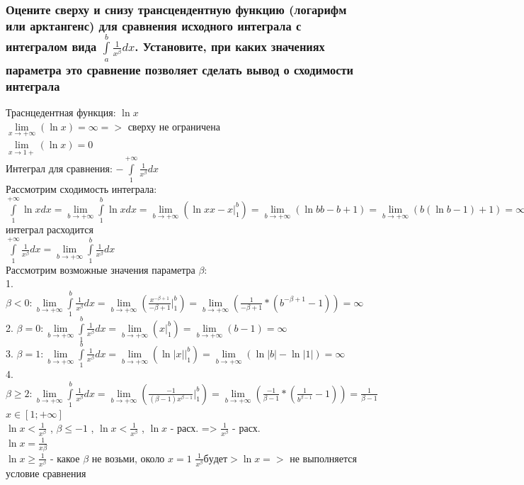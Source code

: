\documentclass{article}
\begin{document}
\subsubsection{Оцените сверху и снизу трансцендентную функцию (логарифм или арктангенс) для сравнения исходного интеграла с интегралом вида $ \int\limits^b_a \frac{1}{x^{\beta}}dx $. Установите, при каких значениях параметра это сравнение позволяет сделать вывод о сходимости интеграла}
Траснцедентная функция: $ \ln{x} $\\
$ \lim\limits_{x \to +\infty} (\ln{x}) = \infty => $ сверху не ограничена\\
$ \lim\limits_{x \to 1+} (\ln{x}) = 0 $\\
Интеграл для сравнения: $ -\int\limits^{+\infty}_{1} \frac{1}{x^{\beta}}dx $\\
Рассмотрим сходимость интеграла:\\
$ \int\limits^{+\infty}_{1} \ln{x}dx = \lim\limits_{b \to +\infty} \int\limits^{b}_{1} \ln{x}dx = \lim\limits_{b \to +\infty} (\ln{x}x - x |^b_1) = \lim\limits_{b \to +\infty} (\ln{b}b - b + 1) = \lim\limits_{b \to +\infty} (b(\ln{b} - 1) + 1) = \infty => $ интеграл расходится\\
$ \int\limits^{+\infty}_1 \frac{1}{x^{\beta}}dx = \lim\limits_{b \to +\infty} \int\limits^b_1 \frac{1}{x^{\beta}}dx $\\
Рассмотрим возможные значения параметра $\beta$:\\
1. $ \beta < 0 : \lim\limits_{b \to +\infty} \int\limits^b_1 \frac{1}{x^{\beta}}dx = \lim\limits_{b \to +\infty} (\frac{x^{-\beta + 1}}{-\beta + 1} |^b_1) = \lim\limits_{b \to +\infty} (\frac{1}{-\beta+1}*(b^{-\beta+1} - 1)) = \infty $\\
2. $ \beta = 0 : \lim\limits_{b \to +\infty} \int\limits^b_1 \frac{1}{x^{\beta}}dx = \lim\limits_{b \to +\infty} (x |^b_1) = \lim\limits_{b \to +\infty} (b - 1) = \infty $\\
3. $ \beta = 1 : \lim\limits_{b \to +\infty} \int\limits^b_1 \frac{1}{x^{\beta}}dx = \lim\limits_{b \to +\infty} (\ln{|x| |^b_1}) = \lim\limits_{b \to +\infty} (\ln{|b|} - \ln{|1|}) = \infty $\\
4. $ \beta \ge 2 : \lim\limits_{b \to +\infty} \int\limits^b_1 \frac{1}{x^{\beta}}dx = \lim\limits_{b \to +\infty} (\frac{-1}{(\beta - 1) x^{\beta - 1}} |^b_1) = \lim\limits_{b \to +\infty} (\frac{-1}{\beta - 1} * (\frac{1}{b^{\beta - 1}} - 1)) = \frac{1}{\beta - 1} $\\
\small $ x \in [1; +\infty] $\\
\normalsize
$ \ln{x} < \frac{1}{x^\beta} $ , $ \beta \leq -1 $ , $ \ln{x} < \frac{1}{x^{\beta}} $ , $ \ln{x} $ - расх. => $ \frac{1}{x^{\beta}} $ - расх.\\
$ \ln{x} = \frac{1}{x{\beta}} $ \\
$ \ln{x} \ge \frac{1}{x^{\beta}} $ - какое $\beta$ не возьми, около $ x = 1 $ $ \frac{1}{x^{\beta}} будет > \ln{x} => $ не выполняется условие сравнения
\end{document}
